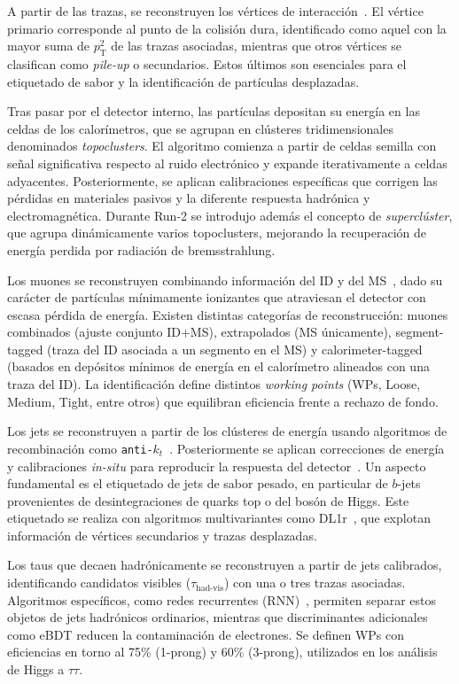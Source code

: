 A partir de las trazas, se reconstruyen los vértices de interacción~\cite{vertex_run1,vertex_run2,vertex_run3}. El vértice primario corresponde al punto de la colisión dura, identificado como aquel con la mayor suma de $p_{\mathrm{T}}^{2}$ de las trazas asociadas, mientras que otros vértices se clasifican como \textit{pile-up} o secundarios. Estos últimos son esenciales para el etiquetado de sabor y la identificación de partículas desplazadas.

Tras pasar por el detector interno, las partículas depositan su energía en las celdas de los calorímetros, que se agrupan en clústeres tridimensionales denominados \textit{topoclusters}. El algoritmo comienza a partir de celdas semilla con señal significativa respecto al ruido electrónico y expande iterativamente a celdas adyacentes. Posteriormente, se aplican calibraciones específicas que corrigen las pérdidas en materiales pasivos y la diferente respuesta hadrónica y electromagnética. Durante Run-2 se introdujo además el concepto de \textit{superclúster}, que agrupa dinámicamente varios topoclusters, mejorando la recuperación de energía perdida por radiación de bremsstrahlung.

Los muones se reconstruyen combinando información del ID y del MS~\cite{muon_reco_run2}, dado su carácter de partículas mínimamente ionizantes que atraviesan el detector con escasa pérdida de energía. Existen distintas categorías de reconstrucción: muones combinados (ajuste conjunto ID+MS), extrapolados (MS únicamente), segment-tagged (traza del ID asociada a un segmento en el MS) y calorimeter-tagged (basados en depósitos mínimos de energía en el calorímetro alineados con una traza del ID). La identificación define distintos \textit{working points} (WPs, Loose, Medium, Tight, entre otros) que equilibran eficiencia frente a rechazo de fondo.

Los jets se reconstruyen a partir de los clústeres de energía usando algoritmos de recombinación como \texttt{anti-$k_{t}$}~\cite{Cacciari_2008}. Posteriormente se aplican correcciones de energía y calibraciones \textit{in-situ} para reproducir la respuesta del detector~\cite{jets_calib}. Un aspecto fundamental es el etiquetado de jets de sabor pesado, en particular de $b$-jets provenientes de desintegraciones de quarks top o del bosón de Higgs. Este etiquetado se realiza con algoritmos multivariantes como DL1r~\cite{tagging}, que explotan información de vértices secundarios y trazas desplazadas.

Los taus que decaen hadrónicamente se reconstruyen a partir de jets calibrados, identificando candidatos visibles ($\tau_{\text{had-vis}}$) con una o tres trazas asociadas. Algoritmos específicos, como redes recurrentes (RNN)~\cite{ATL-PHYS-PUB-2022-044}, permiten separar estos objetos de jets hadrónicos ordinarios, mientras que discriminantes adicionales como eBDT reducen la contaminación de electrones. Se definen WPs con eficiencias en torno al 75\% (1-prong) y 60\% (3-prong), utilizados en los análisis de Higgs a $\tau\tau$.

